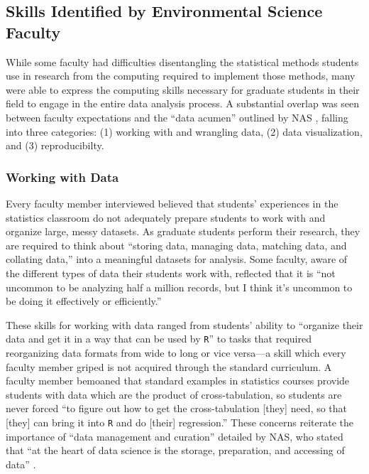 \documentclass[12pt]{article}
\begin{document}
\subsection{Skills Identified by Environmental Science Faculty}

\quad While some faculty had difficulties disentangling the statistical methods
students use in research from the computing required to implement those methods,
many were able to express the computing skills necessary for graduate students
in their field to engage in the entire data analysis process. A substantial
overlap was seen between faculty expectations and the ``data acumen'' outlined
by NAS \citep{nas}, falling into three categories: (1) working with and
wrangling data, (2) data visualization, and (3) reproducibilty.

\subsubsection{Working with Data}  

\quad Every faculty member interviewed believed that students' experiences in the
statistics classroom do not adequately prepare students to work with and
organize large, messy datasets. As graduate students perform their research,
they are required to think about ``storing data, managing data, matching
data, and collating data,'' into a meaningful datasets for analysis. Some 
faculty, aware of the different types of data their students work with, 
reflected that it is ``not uncommon to be analyzing half a million records, but
I think it's uncommon to be doing it effectively or efficiently.'' 

\quad These skills for working with data ranged from students' ability to 
``organize their data and get it in a way that can be used by \texttt{R}'' to 
tasks that required reorganizing data formats from wide to long or vice 
versa---a skill which every faculty member griped is not acquired through the
standard curriculum. A faculty member bemoaned that standard examples in
statistics courses provide students with data which are the product
of cross-tabulation, so students are never forced ``to figure out how to get the
cross-tabulation [they] need, so that [they] can bring it into \texttt{R} and do
[their] regression.'' These concerns reiterate the importance of ``data
management and curation'' detailed by NAS, who stated that ``at the heart of
data science is the storage, preparation, and accessing of data'' 
\citep[p.\ 26]{nas}. 
\end{document}
